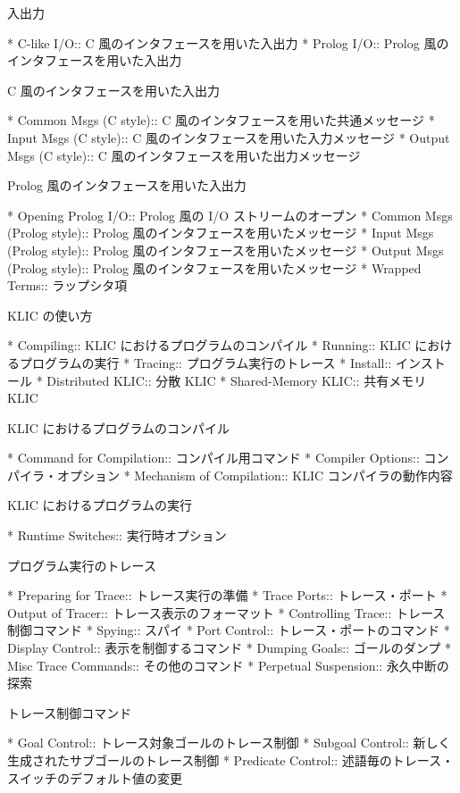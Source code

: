 入出力

* C-like I/O::                  C 風のインタフェースを用いた入出力
* Prolog I/O::                  Prolog 風のインタフェースを用いた入出力

C 風のインタフェースを用いた入出力

* Common Msgs (C style)::       C 風のインタフェースを用いた共通メッセージ
* Input Msgs (C style)::        C 風のインタフェースを用いた入力メッセージ
* Output Msgs (C style)::       C 風のインタフェースを用いた出力メッセージ

Prolog 風のインタフェースを用いた入出力

* Opening Prolog I/O::          Prolog 風の I/O ストリームのオープン
* Common Msgs (Prolog style)::  Prolog 風のインタフェースを用いたメッセージ
* Input Msgs (Prolog style)::   Prolog 風のインタフェースを用いたメッセージ
* Output Msgs (Prolog style)::  Prolog 風のインタフェースを用いたメッセージ
* Wrapped Terms::               ラップシタ項

KLIC の使い方

* Compiling::                   KLIC におけるプログラムのコンパイル
* Running::                     KLIC におけるプログラムの実行
* Tracing::                     プログラム実行のトレース
* Install::                     インストール
* Distributed KLIC::            分散 KLIC
* Shared-Memory KLIC::          共有メモリ KLIC

KLIC におけるプログラムのコンパイル

* Command for Compilation::     コンパイル用コマンド
* Compiler Options::            コンパイラ・オプション
* Mechanism of Compilation::    KLIC コンパイラの動作内容

KLIC におけるプログラムの実行

* Runtime Switches::            実行時オプション

プログラム実行のトレース

* Preparing for Trace::         トレース実行の準備
* Trace Ports::                 トレース・ポート
* Output of Tracer::            トレース表示のフォーマット
* Controlling Trace::           トレース制御コマンド
* Spying::                      スパイ
* Port Control::                トレース・ポートのコマンド
* Display Control::             表示を制御するコマンド
* Dumping Goals::               ゴールのダンプ
* Misc Trace Commands::         その他のコマンド
* Perpetual Suspension::        永久中断の探索

トレース制御コマンド

* Goal Control::                トレース対象ゴールのトレース制御
* Subgoal Control::             新しく生成されたサブゴールのトレース制御
* Predicate Control::           述語毎のトレース・スイッチのデフォルト値の変更

